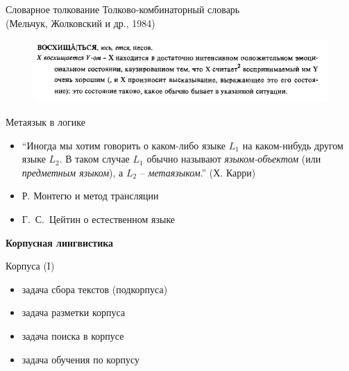 \documentclass{beamer}
\begin{document}
\begin{frame}{Словарное толкование}
Толково-комбинаторный словарь \\(Мельчук, Жолковский и др., 1984)\\
\smallskip
\begin{center}
	\begin{figure}[H]
		\includegraphics[scale=0.4]{tks.png} 
	\end{figure}
\end{center}	
\end{frame}

\begin{frame}{Метаязык в логике}
\begin{itemize}
	\item ``Иногда мы хотим говорить о каком-либо языке $L_1$ на каком-нибудь другом языке $L_2$. В таком случае $L_1$ обычно называют \textit{языком-объектом} (или \textit{предметным языком}), а $L_2$ -- \textit{метаязыком}.'' (Х. Карри)
	\item Р. Монтегю и метод трансляции
	\item Г.~С.~Цейтин о естественном языке
\end{itemize}
\end{frame}

\fi

\begin{frame}{}
\begin{center}
	\textbf{Корпусная лингвистика}
\end{center}
\end{frame}

\begin{frame}{Корпуса (I)}
\begin{itemize}
    \item задача сбора текстов (подкорпуса)
    \item задача разметки корпуса
    \item задача поиска в корпусе
    \item задача обучения по корпусу
\end{itemize}
\end{frame}
\end{document}
